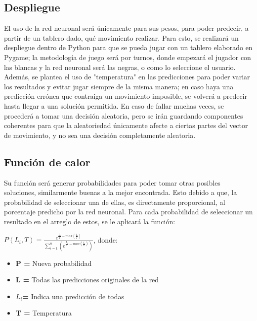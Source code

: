 \subsection{Despliegue}
El uso de la red neuronal será únicamente para sus pesos, para poder predecir, a partir de un tablero dado, qué movimiento realizar. Para esto, se realizará un despliegue dentro de Python para que se pueda jugar con un tablero elaborado en Pygame; la metodología de juego será por turnos, donde empezará el jugador con las blancas y la red neuronal será las negras, o como lo seleccione el usuario.\newline
Además, se plantea el uso de "temperatura" en las predicciones para poder variar los resultados y evitar jugar siempre de la misma manera; en caso haya una predicción errónea que contraiga un movimiento imposible, se volverá a predecir hasta llegar a una solución permitida. En caso de fallar muchas veces, se procederá a tomar una decisión aleatoria, pero se irán guardando componentes coherentes para que la aleatoriedad únicamente afecte a ciertas partes del vector de movimiento, y no sea una decisión completamente aleatoria.


\subsection{Función de calor}

Su función será generar probabilidades para poder tomar otras posibles soluciones, similarmente buenas a la mejor encontrada. Esto debido a que, la probabilidad de seleccionar una de ellas, es directamente proporcional, al porcentaje predicho por la red neuronal. Para cada probabilidad de seleccionar un resultado en el arreglo de estos, se le aplicará la función:

$P(L_i,T) = \frac{e^{\frac{L_i}{T} - max(\frac{L}{T})}}{\sum_{i=1}^{n} (e ^{ \frac{L_i}{T} - max( \frac{L}{T}) })}$, donde:

\begin{itemize}
    \item \textbf{P = } Nueva probabilidad
    \item \textbf{L = } Todas las predicciones originales de la red
    \item \textbf{$L_i$= } Indica una predicción de todas
    \item \textbf{T = } Temperatura
\end{itemize}

